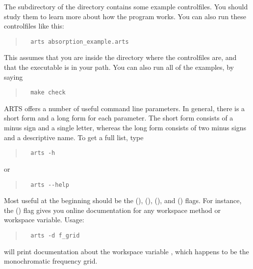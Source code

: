 The subdirectory  of the  directory contains
some example controlfiles. You should study them to learn more about
how the program works. You can also run these controlfiles like this:
\begin{quote}
\begin{verbatim}
  arts absorption_example.arts
\end{verbatim}
\end{quote}
This assumes that you are inside the directory where the controlfiles
are, and that the  executable is in your path.  You can
also run all of the examples, by saying
\begin{quote}
\begin{verbatim}
  make check
\end{verbatim}
\end{quote}

ARTS offers a number of useful command line parameters. In general,
there is a short form and a long form for each parameter. The short
form consists of a minus sign and a single letter, whereas the long
form consists of two minus signs and a descriptive name. To get a full
list, type
\begin{quote}
\begin{verbatim}
  arts -h
\end{verbatim}
\end{quote}
or
\begin{quote}
\begin{verbatim}
  arts --help
\end{verbatim}
\end{quote}
Most useful at the beginning should be the 
(),  (), 
(), and  () flags.
For instance, the  () flag gives you online
documentation for any workspace method or workspace variable. Usage:
\begin{quote}
\begin{verbatim}
  arts -d f_grid
\end{verbatim}
\end{quote}
will print documentation about the workspace variable , which
happens to be the monochromatic frequency grid.

